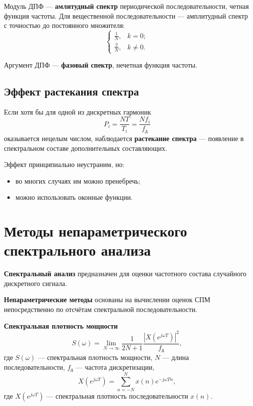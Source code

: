 \documentclass[a4paper, 14pt]{extarticle}
\begin{document}
Модуль ДПФ --- \textbf{амлитудный спектр} периодической последовательности, четная функция частоты. Для вещественной последовательности --- амплитудный спектр с точностью до постоянного множителя:
\begin{equation}
    \begin{cases}
        \frac{1}{N}, &k=0;\\
        \frac{2}{N}, &k\ne 0.
    \end{cases}
\end{equation}

Аргумент ДПФ --- \textbf{фазовый спектр}, нечетная функция частоты.

\subsection{Эффект растекания спектра}\label{subsec:leakage}
Если хотя бы для одной из дискретных гармоник
\begin{equation}
    P_i = \frac{NT}{T_i} = \frac{Nf_i}{f_\text{д}}
\end{equation}
оказывается нецелым числом, наблюдается \textbf{растекание спектра} --- появление в спектральном составе дополнительных составляющих.

Эффект принципиально неустраним, но:
\begin{itemize}
    \item во многих случаях им можно пренебречь;
    \item можно использовать оконные функции.
\end{itemize}

\section{Методы непараметрического спектрального анализа}
\textbf{Спектральный анализ} предназначен для оценки частотного состава случайного дискретного сигнала.

\textbf{Непараметрические методы} основаны на вычислении оценок СПМ непосредственно по отсчётам спектральной последовательности.

\textbf{Спектральная плотность мощности}
\begin{equation}
    S( \omega ) = \lim_{N \to \infty} \frac{1}{2N+1} \frac{{\left| X(e^{j\omega T}) \right|}^2}{f_\text{д}},
\end{equation}
где $S(\omega)$ --- спектральная плотность мощности, $N$ --- длина последовательности, $f_\text{д}$ --- частота дискретизации,
\begin{equation}
    X(e^{j\omega T}) = \sum\limits^{N}_{n=-N} x(n) e^{-j\omega Tn},
\end{equation}
где $X(e^{j\omega T})$ --- спектральная плотность последовательности $x(n)$.
\end{document}
